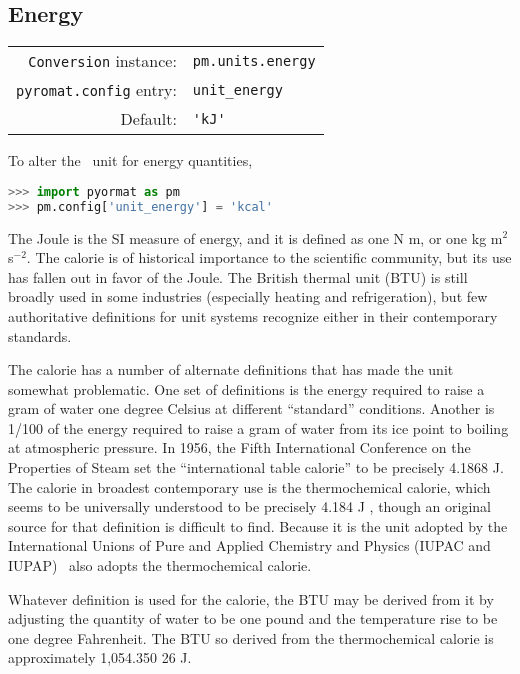 %
%

\subsection{Energy}\label{sec:units:energy}

\begin{tabular}{rl}
\hline
\verb|Conversion| instance: & \verb|pm.units.energy|\\
\verb|pyromat.config| entry: & \verb|unit_energy|\\
Default: & \verb|'kJ'|\\
\hline
\end{tabular}
\vspace{1em}

To alter the \PM\ unit for energy quantities,
\begin{lstlisting}[language=Python]
>>> import pyormat as pm
>>> pm.config['unit_energy'] = 'kcal'
\end{lstlisting}

The Joule is the SI measure of energy, and it is defined as one N m, or one kg m$^2$ s$^{-2}$.  The calorie is of historical importance to the scientific community, but its use has fallen out in favor of the Joule.  The British thermal unit (BTU) is still broadly used in some industries (especially heating and refrigeration), but few authoritative definitions for unit systems recognize either in their contemporary standards.

The calorie has a number of alternate definitions that has made the unit somewhat problematic.  One set of definitions is the energy required to raise a gram of water one degree Celsius at different ``standard'' conditions.  Another is 1/100 of the energy required to raise a gram of water from its ice point to boiling at atmospheric pressure.  In 1956, the Fifth International Conference on the Properties of Steam set the ``international table calorie'' to be precisely 4.1868 J.  The calorie in broadest contemporary use is the thermochemical calorie, which seems to be universally understood to be precisely 4.184 J  \cite{nist:sp811}, though an original source for that definition is difficult to find.  Because it is the unit adopted by the International Unions of Pure and Applied Chemistry and Physics (IUPAC and IUPAP) \cite{crc} \PM\ also adopts the thermochemical calorie.

Whatever definition is used for the calorie, the BTU may be derived from it by adjusting the quantity of water to be one pound and the temperature rise to be one degree Fahrenheit.  The BTU so derived from the thermochemical calorie is approximately 1,054.350 26 J.

